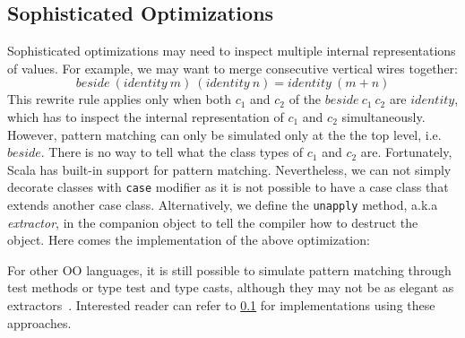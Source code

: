 \subsection{Sophisticated Optimizations}
Sophisticated optimizations may need to inspect multiple internal
representations of values.
For example, we may want to merge consecutive vertical wires together:
$$
beside\ (identity\ m)\ (identity\ n) = identity\ (m + n)
$$
This rewrite rule applies only when both $c_1$ and $c_2$ of the $beside\ c_1\ c_2$
are $identity$, which has to inspect the internal representation of $c_1$ and $c_2$ simultaneously.
However, pattern matching can only be simulated only at the the top level, i.e. $beside$.
There is no way to tell what the class types of $c_1$ and $c_2$ are.
Fortunately, Scala has built-in support for pattern matching. Nevertheless, we
can not simply decorate classes with \lstinline{case} modifier as
it is not possible to have a case class that extends another case class.
Alternatively, we define the \lstinline{unapply} method, a.k.a \emph{extractor}, in the companion object
to tell the compiler how to destruct the object. Here comes the implementation
of the above optimization:

For other OO languages, it is still possible to simulate
pattern matching through test methods or type test and type casts,
although they may not be as elegant as extractors~\cite{emir2007matching}.
Interested reader can refer to \ref{} for implementations using these approaches.

